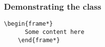 \documentclass{xbeamer}
\begin{document}
\begin{Frame}
  \frametitle{Demonstrating the class}
  \begin{Verbatim}[gobble = 4]
    \begin{frame*}
      Some content here
    \end{frame*}
  \end{Verbatim}
\end{Frame}
\end{document}
